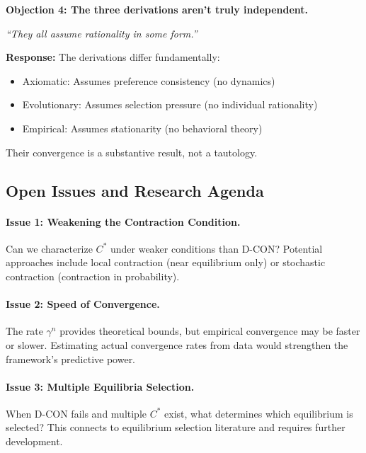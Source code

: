 \begin{tcolorbox}[colback=red!5!white, colframe=red!75!black,
    title=\textbf{Critical Foundations: Objections and Responses}]
\medskip

\textbf{Objection 4: The three derivations aren't truly independent.}

\textit{``They all assume rationality in some form.''}

\textbf{Response:} The derivations differ fundamentally:
\begin{itemize}[nosep]
    \item Axiomatic: Assumes preference consistency (no dynamics)
    \item Evolutionary: Assumes selection pressure (no individual rationality)
    \item Empirical: Assumes stationarity (no behavioral theory)
\end{itemize}
Their convergence is a substantive result, not a tautology.

\end{tcolorbox}


\subsection{Open Issues and Research Agenda}
\label{sec:D-openissues}

\paragraph{Issue 1: Weakening the Contraction Condition.}
Can we characterize $C^*$ under weaker conditions than D-CON? Potential
approaches include local contraction (near equilibrium only) or stochastic
contraction (contraction in probability).

\paragraph{Issue 2: Speed of Convergence.}
The rate $\gamma^n$ provides theoretical bounds, but empirical convergence
may be faster or slower. Estimating actual convergence rates from data
would strengthen the framework's predictive power.

\paragraph{Issue 3: Multiple Equilibria Selection.}
When D-CON fails and multiple $C^*$ exist, what determines which equilibrium
is selected? This connects to equilibrium selection literature
\citep{harsanyiselten1988} and requires further development.

